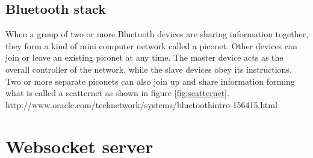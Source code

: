 \documentclass[a4paper, 11pt]{report}
\begin{document}
\subsection{Bluetooth stack}
When a group of two or more Bluetooth devices are sharing information together, they form a kind of mini computer network called a piconet. Other devices can join or leave an existing piconet at any time. The master device acts as the overall controller of the network, while the slave devices obey its instructions. Two or more separate piconets can also join up and share information forming what is called a scatternet as shown in figure \ref{fig:scatternet}.
http://www.oracle.com/technetwork/systems/bluetoothintro-156415.html



	\section{Websocket server}






\end{document}
